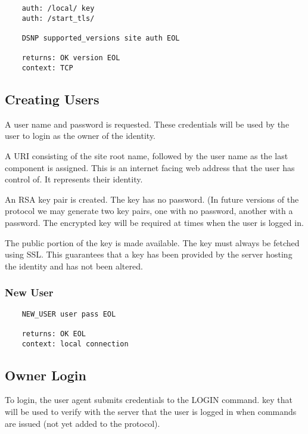 \documentclass[letterpaper,11pt,oneside]{article}
\begin{document}
\vspace{10pt}
\begin{verbatim}
    auth: /local/ key
    auth: /start_tls/

    DSNP supported_versions site auth EOL

    returns: OK version EOL
    context: TCP
\end{verbatim}

\subsection{Creating Users}

\vspace{10pt}
A user name and password is requested. These credentials will be used by the
user to login as the owner of the identity.

A URI consisting of the site root name, followed by the user name as the last
component is assigned. This is an internet facing web address that the user has
control of. It represents their identity.

An RSA key pair is created. The key has no password. (In future versions of the
protocol we may generate two key pairs, one with no password,  another with a
password. The encrypted key will be required at times when the user is logged
in.

The public portion of the key is made available. The key must always be fetched
using SSL. This guarantees that a key has been provided by the server hosting
the identity and has not been altered.

\subsubsection{New User}

\vspace{10pt}
\begin{verbatim}
    NEW_USER user pass EOL

    returns: OK EOL
    context: local connection
\end{verbatim}

\subsection{Owner Login}

To login, the user agent submits credentials to the LOGIN command. key that
will be used to verify with the server that the user is logged in when commands
are issued (not yet added to the protocol).
\end{document}
